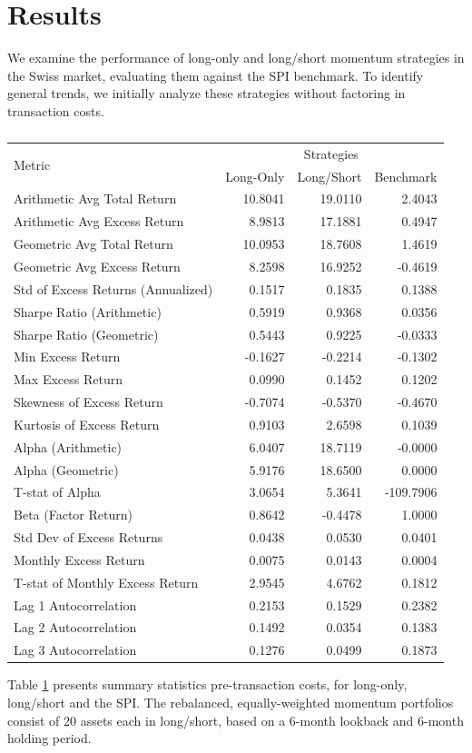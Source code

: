 \documentclass[a4paper,12pt]{article}
\begin{document}
\section{Results}
We examine the performance of long-only and long/short momentum strategies in the Swiss market, evaluating them against the SPI benchmark. To identify general trends, we initially analyze these strategies without factoring in transaction costs.
\begin{table}[htbp]
\centering
\begin{tabular}{lrrr}
\toprule
\multirow{2}{*}{Metric} & \multicolumn{3}{c}{Strategies} \\
\cmidrule(l){2-4}
& Long-Only & Long/Short & Benchmark \\
\midrule
Arithmetic Avg Total Return & 10.8041 & 19.0110 & 2.4043 \\
Arithmetic Avg Excess Return & 8.9813 & 17.1881 & 0.4947 \\
Geometric Avg Total Return & 10.0953 & 18.7608 & 1.4619 \\
Geometric Avg Excess Return & 8.2598 & 16.9252 & -0.4619 \\
Std of Excess Returns (Annualized) & 0.1517 & 0.1835 & 0.1388 \\
Sharpe Ratio (Arithmetic) & 0.5919 & 0.9368 & 0.0356 \\
Sharpe Ratio (Geometric) & 0.5443 & 0.9225 & -0.0333 \\
Min Excess Return & -0.1627 & -0.2214 & -0.1302 \\
Max Excess Return & 0.0990 & 0.1452 & 0.1202 \\
Skewness of Excess Return & -0.7074 & -0.5370 & -0.4670 \\
Kurtosis of Excess Return & 0.9103 & 2.6598 & 0.1039 \\
Alpha (Arithmetic) & 6.0407 & 18.7119 & -0.0000 \\
Alpha (Geometric) & 5.9176 & 18.6500 & 0.0000 \\
T-stat of Alpha & 3.0654 & 5.3641 & -109.7906 \\
Beta (Factor Return) & 0.8642 & -0.4478 & 1.0000 \\
Std Dev of Excess Returns & 0.0438 & 0.0530 & 0.0401 \\
Monthly Excess Return & 0.0075 & 0.0143 & 0.0004 \\
T-stat of Monthly Excess Return & 2.9545 & 4.6762 & 0.1812 \\
Lag 1 Autocorrelation & 0.2153 & 0.1529 & 0.2382 \\
Lag 2 Autocorrelation & 0.1492 & 0.0354 & 0.1383 \\
Lag 3 Autocorrelation & 0.1276 & 0.0499 & 0.1873 \\
\bottomrule
\end{tabular}
\caption{}
\label{tab_01}
\justifying
\small{Table \ref{tab_01} presents summary statistics pre-transaction costs, for long-only, long/short and the SPI. The rebalanced, equally-weighted momentum portfolios consist of 20 assets each in long/short, based on a 6-month lookback and 6-month holding period.}
\end{table}
\end{document}
